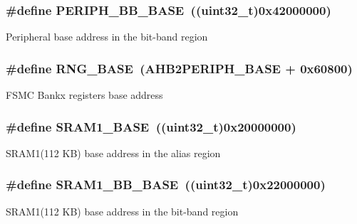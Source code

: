 \subsubsection[{\texorpdfstring{P\+E\+R\+I\+P\+H\+\_\+\+B\+B\+\_\+\+B\+A\+SE}{PERIPH_BB_BASE}}]{\setlength{\rightskip}{0pt plus 5cm}\#define P\+E\+R\+I\+P\+H\+\_\+\+B\+B\+\_\+\+B\+A\+SE~((uint32\+\_\+t)0x42000000)}\hypertarget{group___peripheral__memory__map_gaed7efc100877000845c236ccdc9e144a}{}\label{group___peripheral__memory__map_gaed7efc100877000845c236ccdc9e144a}
Peripheral base address in the bit-\/band region 
\subsubsection[{\texorpdfstring{R\+N\+G\+\_\+\+B\+A\+SE}{RNG_BASE}}]{\setlength{\rightskip}{0pt plus 5cm}\#define R\+N\+G\+\_\+\+B\+A\+SE~({\bf A\+H\+B2\+P\+E\+R\+I\+P\+H\+\_\+\+B\+A\+SE} + 0x60800)}\hypertarget{group___peripheral__memory__map_gab92662976cfe62457141e5b4f83d541c}{}\label{group___peripheral__memory__map_gab92662976cfe62457141e5b4f83d541c}
F\+S\+MC Bankx registers base address 
\subsubsection[{\texorpdfstring{S\+R\+A\+M1\+\_\+\+B\+A\+SE}{SRAM1_BASE}}]{\setlength{\rightskip}{0pt plus 5cm}\#define S\+R\+A\+M1\+\_\+\+B\+A\+SE~((uint32\+\_\+t)0x20000000)}\hypertarget{group___peripheral__memory__map_ga7d0fbfb8894012dbbb96754b95e562cd}{}\label{group___peripheral__memory__map_ga7d0fbfb8894012dbbb96754b95e562cd}
S\+R\+A\+M1(112 K\+B) base address in the alias region 
\subsubsection[{\texorpdfstring{S\+R\+A\+M1\+\_\+\+B\+B\+\_\+\+B\+A\+SE}{SRAM1_BB_BASE}}]{\setlength{\rightskip}{0pt plus 5cm}\#define S\+R\+A\+M1\+\_\+\+B\+B\+\_\+\+B\+A\+SE~((uint32\+\_\+t)0x22000000)}\hypertarget{group___peripheral__memory__map_gac4c4f61082e4b168f29d9cf97dc3ca5c}{}\label{group___peripheral__memory__map_gac4c4f61082e4b168f29d9cf97dc3ca5c}
S\+R\+A\+M1(112 K\+B) base address in the bit-\/band region 
